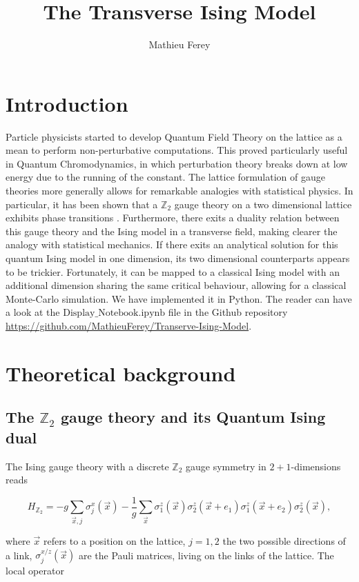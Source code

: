 \documentclass[11pt,openany]{article}
\title{The Transverse Ising Model }
\author{Mathieu Ferey}
\begin{document}
	


\tableofcontents\clearpage

\section{Introduction}

Particle physicists started to develop Quantum Field Theory on the lattice as a mean to perform non-perturbative computations. This proved particularly useful in Quantum Chromodynamics, in which perturbation theory breaks down at low energy due to the running of the constant. The lattice formulation of gauge theories more generally allows for remarkable analogies with statistical physics. In particular, it has been shown that a $\mathds{Z}_2$ gauge theory on a two dimensional lattice exhibits phase transitions \cite{Wegner}. Furthermore, there exits a duality relation between this gauge theory and the Ising model in a transverse field, making clearer the analogy with statistical mechanics. If there exits an analytical solution for this quantum Ising model in one dimension, its two dimensional counterparts appears to be trickier. Fortunately, it can be mapped to a classical Ising model with an additional dimension sharing the same critical behaviour, allowing for a classical Monte-Carlo simulation. We have implemented it in Python. The reader can have a look at the $\mathrm{Display\_Notebook.ipynb}$ file in the Github repository \url{https://github.com/MathieuFerey/Transerve-Ising-Model}.

\section{Theoretical background}

\subsection{The $\mathds{Z}_2$ gauge theory and its Quantum Ising dual}

The Ising gauge theory with a discrete $\mathds{Z}_2$ gauge symmetry in $2+1$-dimensions \cite{fradkin} reads

\begin{equation}
	H_{\mathds{Z}_2} = -g\sum_{\vec{x},j}\sigma^x_j(\vec{x}) - \frac{1}{g}\sum_{\vec{x}}\sigma_1^z(\vec{x})\sigma_2^z(\vec{x}+e_1)\sigma_1^z(\vec{x}+e_2)\sigma_2^z(\vec{x}),
\end{equation}

where $\vec{x}$ refers to a position on the lattice, $j=1,2$ the two possible directions of a link, $\sigma_j^{x/z}(\vec{x})$ are the Pauli matrices, living on the links of the lattice. The local operator
\end{document}

